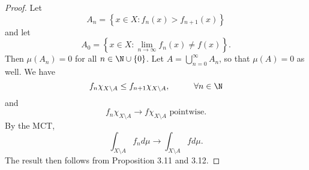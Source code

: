 \documentclass[pmath451]{subfiles}
\begin{document}
    \begin{proof}
        Let
        \begin{equation*}
            A_n = \left\lbrace x\in X: f_n\left( x \right)>f_{n+1}\left( x \right) \right\rbrace
        \end{equation*}
        and let
        \begin{equation*}
            A_0 = \left\lbrace x\in X: \lim_{n\to\infty}f_n\left( x \right)\neq f\left( x \right) \right\rbrace.
        \end{equation*}
        Then $\mu\left( A_n \right) = 0$ for all $n\in\N\cup\left\lbrace 0 \right\rbrace$. Let $A = \bigcup^{\infty}_{n=0} A_n$, so that $\mu\left( A \right) = 0$ as well. We have
        \begin{equation*}
            f_n\chi_{X\setminus A} \leq f_{n+1}\chi_{X\setminus A},\hspace{1cm}\forall n\in\N
        \end{equation*}
        and
        \begin{equation*}
            f_n\chi_{X\setminus A} \to f\chi_{X\setminus A}\text{ pointwise}.
        \end{equation*}
        By the MCT,
        \begin{equation*}
            \int_{X\setminus A}f_nd\mu \to \int_{X\setminus A}fd\mu.
        \end{equation*}
        The result then follows from Proposition 3.11 and 3.12.
    \end{proof}


    
    
    
    
    
    
    
    
    
    
    
    
    
    
    
    
    
    
    
    
    
    
    
    
    
    
    
    
\end{document}
